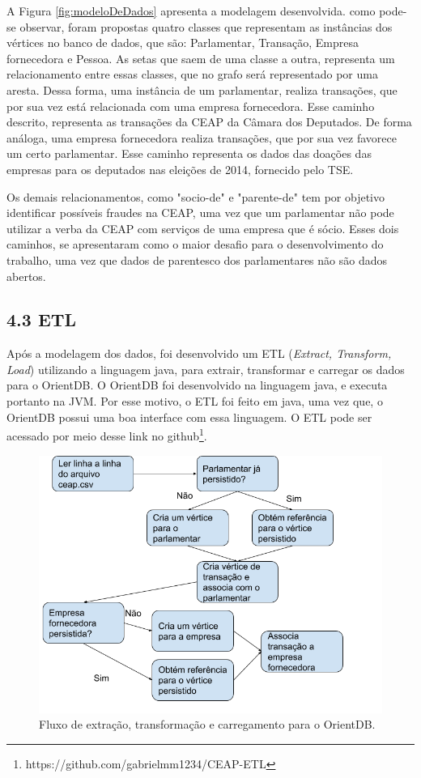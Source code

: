 \documentclass[12pt]{article}
\begin{document}
A Figura \ref{fig:modeloDeDados} apresenta a modelagem desenvolvida. como pode-se observar, foram propostas quatro classes que representam as instâncias dos vértices no banco de dados, que são: Parlamentar, Transação, Empresa fornecedora e Pessoa. As setas que saem de uma classe a outra, representa um relacionamento entre essas classes, que no grafo será representado por uma aresta. Dessa forma, uma instância de um parlamentar, realiza transações, que por sua vez está relacionada com uma empresa fornecedora. Esse caminho descrito, representa as transações da CEAP da Câmara dos Deputados. De forma análoga, uma empresa fornecedora realiza transações, que por sua vez favorece um certo parlamentar. Esse caminho representa os dados das doações das empresas para os deputados nas eleições de 2014, fornecido pelo TSE. 

Os demais relacionamentos, como "socio-de" e "parente-de" tem por objetivo identificar possíveis fraudes na CEAP, uma vez que um parlamentar não pode utilizar a verba da CEAP com serviços de uma empresa que é sócio. Esses dois caminhos, se apresentaram como o maior desafio para o desenvolvimento do trabalho, uma vez que dados de parentesco dos parlamentares não são dados abertos.

\subsection{4.3 ETL} \label{sec:etl}

	Após a modelagem dos dados, foi desenvolvido um ETL (\textit{Extract, Transform, Load}) utilizando a linguagem java, para extrair, transformar e carregar os dados para o OrientDB. O OrientDB foi desenvolvido na linguagem java, e executa portanto na JVM. Por esse motivo, o ETL foi feito em java, uma vez que, o OrientDB possui uma boa interface com essa linguagem. O ETL pode ser acessado por meio desse link no github\footnote{https://github.com/gabrielmm1234/CEAP-ETL}.
	
\begin{figure}[ht]
\centering
\includegraphics[width=.5\textwidth]{etlfluxo.png}
\caption{Fluxo de extração, transformação e carregamento para o OrientDB.}
\label{fig:etlfluxo}
\end{figure}
\end{document}
